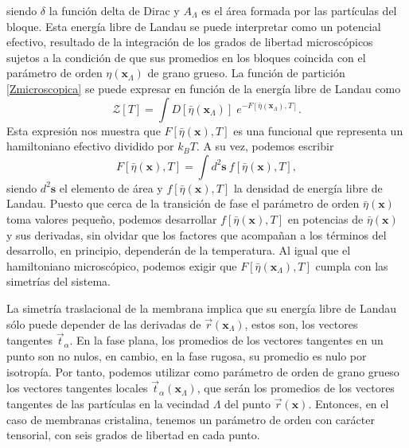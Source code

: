 siendo $\delta$ la función delta de Dirac y $A_{\Lambda}$ es el área
formada por las partículas del bloque. Esta energía libre de Landau se puede
interpretar como un potencial efectivo, resultado de la integración de los
grados de libertad microscópicos sujetos a la condición de que sus promedios
en los  bloques coincida con el parámetro de orden
$\eta(\mathbf{x}_{\Lambda})$ de grano grueso. La función de partición
\eqref{Zmicroscopica} se puede expresar en función de la energía libre de
Landau como
\begin{equation*}
\mathcal{Z}[T]=\int D[\bar{\eta}(\mathbf{x}_{\Lambda})]\; e^{-F[\bar{\eta}(\mathbf{x}_{\Lambda}),T]}.
\end{equation*}
Esta expresión nos muestra que $F[\bar{\eta}(\mathbf{x}),T]$ es una funcional
que representa un hamiltoniano efectivo dividido por $k_BT$. A su vez, podemos
escribir 
\begin{equation*}
F[\bar{\eta}(\mathbf{x}),T]=\int\! d^2\mathbf{s}\ f[\bar{\eta}(\mathbf{x}),T],
\end{equation*}
siendo $d^2\mathbf{s}$ el elemento de área y $f[\bar{\eta}(\mathbf{x}),T]$ la
densidad de energía libre de Landau. Puesto que cerca de la transición de fase
el parámetro de orden $\bar{\eta}(\mathbf{x})$ toma valores pequeño, podemos
desarrollar $f[\bar{\eta}(\mathbf{x}),T]$ en potencias de
$\bar{\eta}(\mathbf{x})$ y sus derivadas, sin olvidar que los factores que
acompañan a los términos del desarrollo, en principio, dependerán de la
temperatura. Al igual que el hamiltoniano microscópico, podemos exigir que
$F[\bar{\eta}(\mathbf{x}_{\Lambda}),T]$ cumpla con las simetrías del sistema.

La simetría traslacional de la membrana implica que su energía libre de Landau
sólo puede depender de las derivadas de $\vec{r}(\mathbf{x}_{\Lambda})$, estos
son, los vectores tangentes $\vec{t}_{\alpha}$. En la fase
plana, los promedios de los vectores tangentes en un punto son no nulos, en
cambio, en la fase rugosa, su promedio es nulo por isotropía. Por tanto,
podemos utilizar como  parámetro de orden de grano grueso los vectores
tangentes locales $\vec{t}_{\alpha}(\mathbf{x}_{\Lambda})$, que serán
los promedios de los vectores tangentes de las partículas en la vecindad
$\Lambda$ del punto $\vec{r}(\mathbf{x})$. Entonces, en el caso de
membranas cristalina, tenemos un parámetro de orden con carácter tensorial,
con seis grados de libertad en cada punto.

